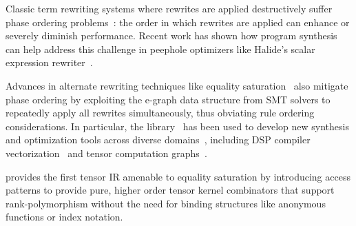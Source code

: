 Classic term rewriting systems where
  rewrites are applied destructively suffer
  phase ordering problems~\cite{phase-ordering}:
  the order in which rewrites are applied can
  enhance or severely diminish performance.
Recent work has shown how program synthesis
  can help address this challenge in
  peephole optimizers like Halide's
  scalar expression rewriter~\cite{
    newcomb2020halide-rewrite}.
  
Advances in alternate rewriting techniques
  like equality saturation~\cite{tate2009equality}
  also mitigate phase ordering by exploiting
  the e-graph data structure from SMT solvers
  to repeatedly apply all rewrites simultaneously,
  thus obviating rule ordering considerations.
In particular,
  the  library~\cite{willsey2021egg}
  has been used to develop new synthesis and
  optimization tools across diverse domains~\cite{
    herbie, szalinski, wang2020spores},
  including DSP compiler vectorization~\cite{
    vanhattum2021vectorization} and
  tensor computation graphs~\cite{yang2021equality}.

\g provides the first tensor IR
  amenable to equality saturation by
  introducing access patterns to
  provide pure, higher order tensor
  kernel combinators that support
  rank-polymorphism without the need
  for binding structures like
  anonymous functions or index notation.


  

